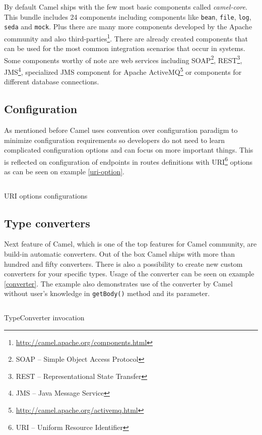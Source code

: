 \documentclass[12pt,final,oneside]{fithesis2}
\begin{document}
By default Camel ships with the few most basic components called \textit{camel-core}. This bundle includes 24 components including components like \texttt{bean}, \texttt{file}, \texttt{log}, \texttt{seda} and \texttt{mock}. Plus there are many more components developed by the Apache community and also third-parties\footnote{\url{http://camel.apache.org/components.html}}. There are already created components that can be used for the most common integration scenarios that occur in systems. Some components worthy of note are web services including SOAP\footnote{SOAP -- Simple Object Access Protocol}, REST\footnote{REST -- Representational State Transfer}, JMS\footnote{JMS -- Java Message Service}, specialized JMS component for Apache ActiveMQ\footnote{\url{http://camel.apache.org/activemq.html}} or components for different database connections.


\subsection*{Configuration}
As mentioned before Camel uses convention over configuration paradigm to minimize configuration requirements so developers do not need to learn complicated configuration options and can focus on more important things. This is reflected on configuration of endpoints in routes definitions with URI\footnote{URI -- Uniform Resource Identifier} options as can be seen on example \ref{uri-option}.
\begin{listing}[ht]
	\inputminted[]{java}{sources/uri.java}
	\caption{URI options configurations}
	\label{uri-option}
\end{listing}

\subsection*{Type converters}
Next feature of Camel, which is one of the top features for Camel community, are build-in automatic converters. Out of the box Camel ships with more than hundred and fifty converters\cite{camel-in-action}. There is also a possibility to create new custom converters for your specific types. Usage of the converter can be seen on example \ref{converter}. The example also demonstrates use of the converter by Camel without user's knowledge in \texttt{getBody()} method and its parameter.

\begin{listing}[ht, p!]
	\inputminted[]{java}{sources/converter.java}
	\caption{TypeConverter invocation}
	\label{converter}
\end{listing}
\end{document}
